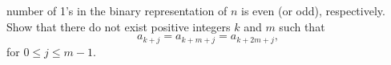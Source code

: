 number of 1's in the binary representation of $n$ is even (or odd),
respectively. Show that there do not exist positive integers $k$ and $m$
such that
\[
a_{k+j} = a_{k+m+j} = a_{k+2m+j},
\]
for $0 \leq j \leq m-1$.
